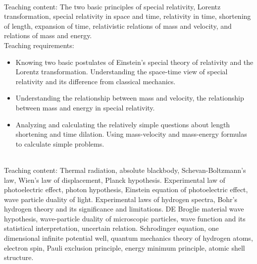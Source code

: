 \documentclass[10pt,a4paper,oneside]{article}
\begin{document}
\\

Teaching content: The two basic principles of special relativity, Lorentz transformation, special relativity in space and time, relativity in time, shortening of length, expansion of time, relativistic relations of mass and velocity, and relations of mass and energy.\\

Teaching requirements:
\begin{itemize}
	\item Knowing two basic postulates of Einstein's special theory of relativity and the Lorentz transformation. Understanding the space-time view of special relativity and its difference from classical mechanics.
	\item Understanding the relationship between mass and velocity, the relationship between mass and energy in special relativity.
	\item Analyzing and calculating the relatively simple questions about length shortening and time dilation.  Using mass-velocity and mass-energy formulas to calculate simple problems.
\end{itemize}
\\

Teaching content: Thermal radiation, absolute blackbody, Schevan-Boltzmann's law, Wien's law of displacement, Planck hypothesis. Experimental law of photoelectric effect, photon hypothesis, Einstein equation of photoelectric effect, wave particle duality of light. Experimental laws of hydrogen spectra, Bohr's hydrogen theory and its significance and limitations. DE Broglie material wave hypothesis, wave-particle duality of microscopic particles, wave function and its statistical interpretation, uncertain relation. Schrodinger equation, one dimensional infinite potential well, quantum mechanics theory of hydrogen atoms, electron spin, Pauli exclusion principle, energy minimum principle, atomic shell structure.\\
\end{document}
